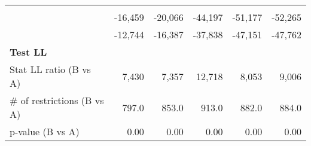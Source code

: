 \begin{tabular}{llllll}
  \multicolumn{1}{|r}{} &
  \multicolumn{1}{r}{} &
  \multicolumn{1}{r}{} &
  \multicolumn{1}{r}{} &
  \multicolumn{1}{r}{} \\
\multicolumn{1}{l}{\hspace{1em}{Model (A)}} &
  \multicolumn{1}{|r}{-16,459} &
  \multicolumn{1}{r}{-20,066} &
  \multicolumn{1}{r}{-44,197} &
  \multicolumn{1}{r}{-51,177} &
  \multicolumn{1}{r}{-52,265} \\
\multicolumn{1}{l}{\hspace{1em}{Model (B)}} &
  \multicolumn{1}{|r}{-12,744} &
  \multicolumn{1}{r}{-16,387} &
  \multicolumn{1}{r}{-37,838} &
  \multicolumn{1}{r}{-47,151} &
  \multicolumn{1}{r}{-47,762} \\
\multicolumn{1}{l}{\textbf{Test LL}} &
  \multicolumn{1}{|r}{} &
  \multicolumn{1}{r}{} &
  \multicolumn{1}{r}{} &
  \multicolumn{1}{r}{} &
  \multicolumn{1}{r}{} \\
\multicolumn{1}{l}{\hspace{1em}Stat LL ratio (B vs A)} &
  \multicolumn{1}{|r}{7,430} &
  \multicolumn{1}{r}{7,357} &
  \multicolumn{1}{r}{12,718} &
  \multicolumn{1}{r}{8,053} &
  \multicolumn{1}{r}{9,006} \\
\multicolumn{1}{l}{\hspace{1em}$\#$ of restrictions (B vs A)} &
  \multicolumn{1}{|r}{797.0} &
  \multicolumn{1}{r}{853.0} &
  \multicolumn{1}{r}{913.0} &
  \multicolumn{1}{r}{882.0} &
  \multicolumn{1}{r}{884.0} \\
\multicolumn{1}{l}{\hspace{1em}p-value (B vs A)} &
  \multicolumn{1}{|r}{0.00} &
  \multicolumn{1}{r}{0.00} &
  \multicolumn{1}{r}{0.00} &
  \multicolumn{1}{r}{0.00} &
  \multicolumn{1}{r}{0.00} \\
\cline{1-6}
\end{tabular}
